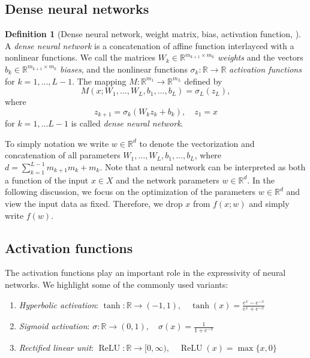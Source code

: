 \documentclass[12pt]{article}
\theoremstyle{definition}
\newtheorem{definition}[definition]{Definition}
\numberwithin{equation}{section}
\newcommand{\R}{\mathbb{R}}
\DeclareMathOperator{\ReLU}{ReLU}
\begin{document}
\subsection{Dense neural networks}
\begin{definition}[Dense neural network, weight matrix, bias, activation function, ]
  A \emph{dense neural network} is a concatenation of affine function interlayced with a nonlinear functions. We call the matrices $W_k \in \R^{m_{k+1} \times m_k}$ \emph{weights} and the vectors $b_k \in \R^{m_{k+1} \times m_k}$ \emph{biases}, and the nonlinear functions $\sigma_k : \R \rightarrow \R$ \emph{activation functions} for $k = 1, \dots, L-1$. The mapping $M : \R^{m_1} \rightarrow \R^{m_L}$ defined by
  \begin{equation*}
      M(x;W_1,\dots,W_L,b_1,\dots,b_L) = \sigma_L(z_L),
  \end{equation*}
  where 
  \begin{equation*}
    z_{k+1} = \sigma_k(W_k z_k + b_k), \quad z_1 = x
  \end{equation*}
  for $k = 1, \dots L-1$ is called \emph{dense neural network}.
\end{definition}
To simply notation we write $w \in \R^d$ to denote the vectorization and concatenation of all parameters $W_1, \dots, W_L, b_1, \dots, b_L$, where $d = \sum_{k=1}^{L-1} m_{k+1}m_k + m_k$.
Note that a neural network can be interpreted as both a function of the input $x \in X$ and the network parameters $w \in \R^d$. In the following discussion, we focus on the optimization of the parameters $w \in \R^d$ and view the input data as fixed. Therefore, we drop $x$ from $f(x;w)$ and simply write $f(w)$.
\subsection{Activation functions}
The activation functions play an important role in the expressivity of neural networks. We highlight some of the commonly used variants:
\begin{enumerate}
  \item \emph{Hyperbolic activation}: $\tanh : \R \rightarrow (-1,1), \quad \tanh(x) = \frac{e^x - e^{-x}}{e^x + e^{-x}}$
  \item \emph{Sigmoid activation}: $\sigma : \R \rightarrow (0,1), \quad \sigma(x) = \frac{1}{1+e^{-x}}$
  \item \emph{Rectified linear unit}: $\ReLU : \R \rightarrow [0,\infty), \quad \ReLU(x) = \max\{x,0\}$
\end{enumerate}
\end{document}
